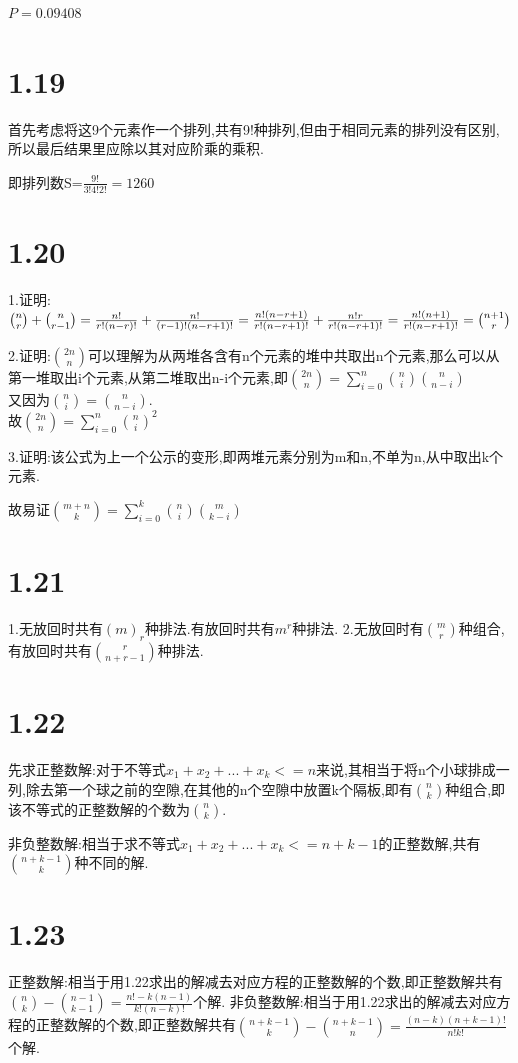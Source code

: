 \documentclass[12pt,a4paper]{ctexart}
\begin{document}
$P=0.09408$
\section{1.19}
首先考虑将这9个元素作一个排列,共有9!种排列,但由于相同元素的排列没有区别,所以最后结果里应除以其对应阶乘的乘积.

即排列数S=$\frac{9!}{3!4!2!}=1260$
\section{1.20}
1.证明:$\binom{n}{r}+\binom{n}{r-1}=\frac{n!}{r!(n-r)!}+\frac{n!}{(r-1)!(n-r+1)!}\\
	=\frac{n!(n-r+1)}{r!(n-r+1)!}+\frac{n!r}{r!(n-r+1)!}\\
	=\frac{n!(n+1)}{r!(n-r+1)!}\\
	=\binom{n+1}{r}$

2.证明:$\binom{2n}{n}$可以理解为从两堆各含有n个元素的堆中共取出n个元素,那么可以从第一堆取出i个元素,从第二堆取出n-i个元素,即$\binom{2n}{n}=\sum_{i=0}^n\binom{n}{i}\binom{n}{n-i}$\\
又因为$\binom{n}{i}=\binom{n}{n-i}$.\\
故$\binom{2n}{n}=\sum_{i=0}^n\binom{n}{i}^2$

3.证明:该公式为上一个公示的变形,即两堆元素分别为m和n,不单为n,从中取出k个元素.

故易证$\binom{m+n}{k}=\sum_{i=0}^k\binom{n}{i}\binom{m}{k-i}$
\section{1.21}
1.无放回时共有$(m)_r$种排法.有放回时共有$m^r$种排法.
2.无放回时有$\binom{m}{r}$种组合,有放回时共有$\binom{r}{n+r-1}$种排法.

\section{1.22}
先求正整数解:对于不等式$x_1+x_2+...+x_k<=n$来说,其相当于将n个小球排成一列,除去第一个球之前的空隙,在其他的n个空隙中放置k个隔板,即有$\binom{n}{k}$种组合,即该不等式的正整数解的个数为$\binom{n}{k}$.

非负整数解:相当于求不等式$x_1+x_2+...+x_k<=n+k-1$的正整数解,共有$\binom{n+k-1}{k}$种不同的解.
\section{1.23}
正整数解:相当于用1.22求出的解减去对应方程的正整数解的个数,即正整数解共有$\binom{n}{k}-\binom{n-1}{k-1}=\frac{n!-k(n-1)}{k!(n-k)!}$个解.
非负整数解:相当于用1.22求出的解减去对应方程的正整数解的个数,即正整数解共有$\binom{n+k-1}{k}-\binom{n+k-1}{n}=\frac{(n-k)(n+k-1)!}{n!k!}$个解.
\end{document}
